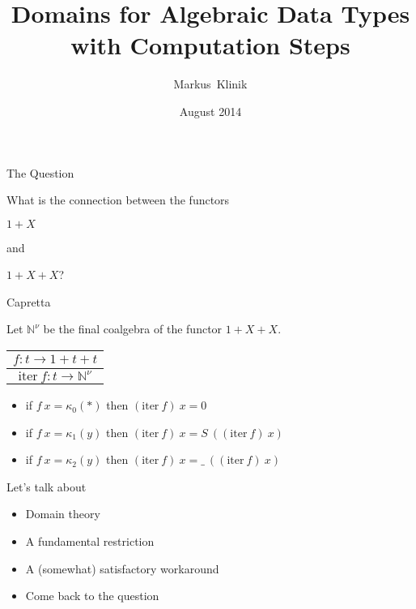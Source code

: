 \documentclass{beamer}
\title
{Domains for Algebraic Data Types with Computation Steps}
\author
{Markus~Klinik}
\institute[Radboud University Nijmegen]
{
  Radboud University Nijmegen
}
\date
{August 2014}
\newcommand{\bbN}{\mathbb{N}}
\newcommand{\arr}{\rightarrow}
\begin{document}
\begin{frame}
  \titlepage
\end{frame}


\begin{frame}{The Question}

\begin{center}
What is the connection between the functors

$1+X$

and

$1+X+X$?
\end{center}

\end{frame}


\begin{frame}{Capretta}

\onslide<+->
Let $\bbN^\nu$ be the final coalgebra of the functor $1+X+X$.

\begin{center}
\begin{tabular}{c}
$f : t \arr 1\!+\!t\!+\!t$ \\
\hline
$\text{iter}\ f : t \arr \bbN^\nu$
\end{tabular}
\end{center}

\onslide<+->
\begin{itemize}
\item if $f\ x = \kappa_0(*)$ then $(\text{iter}\ f)\ x = 0$
\item if $f\ x = \kappa_1(y)$ then $(\text{iter}\ f)\ x = S\ ((\text{iter}\ f)\ x)$
\item if $f\ x = \kappa_2(y)$ then $(\text{iter}\ f)\ x = \_\ ((\text{iter}\ f)\ x)$
\end{itemize}

\end{frame}



\begin{frame}{Let's talk about}

\begin{itemize}
\item Domain theory
\item A fundamental restriction
\item A (somewhat) satisfactory workaround
\item Come back to the question
\end{itemize}

\end{frame}
\end{document}
